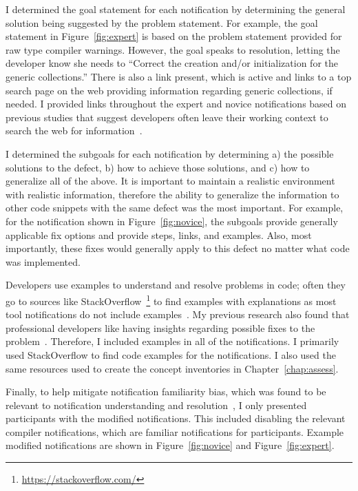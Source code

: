 I determined the goal statement for each notification by determining the general solution being suggested by the problem statement. For example, the goal statement in Figure~\ref{fig:expert} is based on the problem statement provided for raw type compiler warnings. However, the goal speaks to resolution, letting the developer know she needs to ``Correct the creation and/or initialization for the generic collections.'' There is also a link present, which is active and links to a top search page on the web providing information regarding generic collections, if needed.
I provided links throughout the expert and novice notifications based on previous studies that suggest developers often leave their working context to search the web for information~\cite{johnson2016cross,nasehi2012makes}.

I determined the subgoals for each notification by determining a) the possible solutions to the defect, b) how to achieve those solutions, and c) how to generalize all of the above.
It is important to maintain a realistic environment with realistic information, therefore the ability to generalize the information to other code snippets with the same defect was the most important. For example, for the notification shown in Figure~\ref{fig:novice}, the subgoals provide generally applicable fix options and provide steps, links, and examples. Also, most importantly, these fixes would generally apply to this defect no matter what code was implemented.

Developers use examples to understand and resolve problems in code; often they go to sources like StackOverflow~\footnote{\url{https://stackoverflow.com/}} to find examples with explanations as most tool notifications do not include examples~\cite{nasehi2012makes}.
My previous research also found that professional developers like having insights regarding possible fixes to the problem~\cite{johnson2013don,johnson2016cross}.
Therefore, I included examples in all of the notifications. I primarily used StackOverflow to find code examples for the notifications. I also used the same resources used to create the concept inventories in Chapter~\ref{chap:assess}.

Finally, to help mitigate notification familiarity bias, which was found to be relevant to notification understanding and resolution~\cite{johnson2016cross}, I only presented participants with the modified notifications. This included disabling the relevant compiler notifications, which are familiar notifications for participants. 
Example modified notifications are shown in Figure~\ref{fig:novice} and Figure~\ref{fig:expert}.

